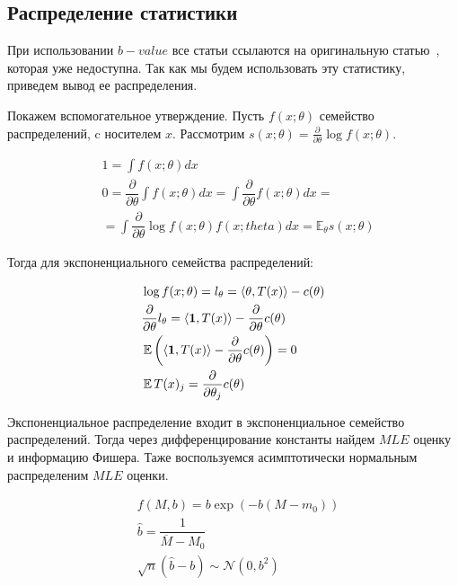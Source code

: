 \subsection{Распределение статистики}
При использовании $b-value$ все статьи ссылаются на оригинальную статью~\cite{b_val_distrib}, которая уже недоступна. Так как мы будем использовать эту статистику, приведем вывод ее распределения.

Покажем вспомогательное утверждение. Пусть $f(x;\theta)$ семейство распределений, c носителем $x$. Рассмотрим $s(x;\theta) = \frac{\partial}{\partial \theta}\log f(x;\theta)$.

\begin{equation*}
\begin{aligned}
& 1 = \int f(x;\theta) dx \\
& 0 = \dfrac{\partial}{\partial \theta}\int f(x;\theta) dx = \int \dfrac{\partial}{\partial \theta}  f(x;\theta) dx = \\
& = \int \dfrac{\partial}{\partial \theta} \log f(x;\theta)f(x;theta) dx = \mathbb{E}_{\theta} s(x;\theta)
\end{aligned}
\end{equation*}

Тогда для экспоненциального семейства распределений:

\begin{equation*}
\begin{aligned}
& \log f(x;\theta) = l_{\theta} = \langle \theta, T(x) \rangle - c(\theta)  \\
& \dfrac{\partial}{\partial \theta} l_{\theta} = \langle \textbf{1}, T(x) \rangle - \dfrac{\partial }{\partial \theta}c(\theta) \\
& \operatorname{\mathbb{E}} \left(\langle \textbf{1}, T(x) \rangle - \dfrac{\partial }{\partial \theta}c(\theta)\right) = 0 \\
& \operatorname{\mathbb{E}} T(x)_{j} = \dfrac{\partial}{\partial \theta_{j}}c(\theta)
\end{aligned}
\end{equation*}

Экспоненциальное распределение входит в экспоненциальное семейство распределений. Тогда через дифференцирование константы найдем $MLE$ оценку и информацию Фишера. Таже воспользуемся асимптотически нормальным распределеним $MLE$ оценки.

\begin{equation*}
\begin{aligned}
& f(M, b) = b\exp\left(-b(M-m_0)\right) \\
& \hat{b} = \dfrac{1}{\overline{M} - M_0} \\
& \sqrt{n}(\hat{b} - b) \sim \mathcal{N}(0, b^2)
\end{aligned}
\end{equation*}

